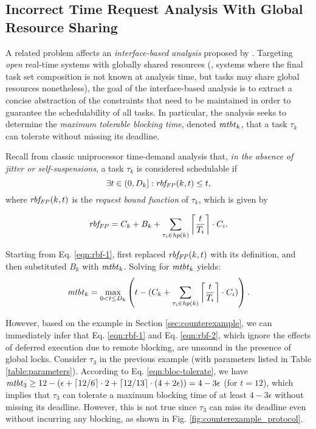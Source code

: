\subsection{Incorrect Time Request Analysis With Global Resource Sharing}

A related problem affects an \emph{interface-based analysis}  proposed by \cite{NBN:11}. Targeting \emph{open} real-time systems with globally shared resources (\ie, systems where the final task set composition is not known at analysis time, but tasks may share global resources nonetheless), the goal of the interface-based analysis is to extract a concise abstraction of the constraints that need to be maintained in order  to guarantee the schedulability of all tasks. In particular, the analysis seeks to determine the \emph{maximum tolerable blocking time}, denoted $\mathit{mtbt}_k$, that a task $\tau_k$ can tolerate without missing its deadline. 

Recall from classic uniprocessor time-demand analysis \cite{lehoczky-1989} that, \emph{in the absence of jitter or self-suspensions}, a task $\tau_k$ is considered schedulable if
\begin{equation}
\label{eqn:rbf-1}
\exists t \in (0,D_k]: \mathit{rbf_{FP}}(k,t) \leq t, 
\end{equation}
where $\mathit{rbf_{FP}}(k,t)$ is the \emph{request bound function} of $\tau_k$, which is given by

\begin{equation}
\label{eqn:rbf-2}
\mathit{rbf_{FP}} = C_k + B_k + \sum_{\tau_i \in \mathit{hp}(k)} \left \lceil \frac{t}{T_i} \right \rceil \cdot C_i.
\end{equation}

Starting from Eq. \eqref{eqn:rbf-1}, \cite{NBN:11} first  replaced $\mathit{rbf_{FP}}(k,t)$ with its definition, and then substituted  $B_k$ with $\mathit{mtbt}_k$. Solving for $\mathit{mtbt}_k$ yields:
\begin{equation}
\label{eqn:bloc-tolerate}
\mathit{mtbt}_k = \max_{0<t \leq D_k} \left( t - ( C_k + \sum_{\tau_i \in \mathit{hp}(k)} \left \lceil \frac{t}{T_i} \right \rceil \cdot C_i ) \right).
\end{equation}

However, based on the example in Section \ref{sec:counterexample}, we can immediately infer that Eq. \eqref{eqn:rbf-1} and Eq. \eqref{eqn:rbf-2}, which ignore the effects of deferred execution due to remote blocking, are unsound in the presence of global locks. Consider $\tau_3$ in the previous example (with parameters listed in Table \ref{table:parameters}). According to Eq. \eqref{eqn:bloc-tolerate}, we have $\mathit{mtbt}_3 \geq 12 - (\epsilon + \lceil 12 / 6 \rceil \cdot 2 + \lceil 12 / 13 \rceil \cdot (4+2\epsilon)) = 4-3\epsilon$ (for $t=12$), which implies that $\tau_3$ can tolerate a maximum blocking time of at least $4-3\epsilon$ without missing its deadline. However, this is not true since $\tau_3$ can miss its deadline even without incurring any blocking, as shown in Fig. \ref{fig:counterexample_protocol}. 

